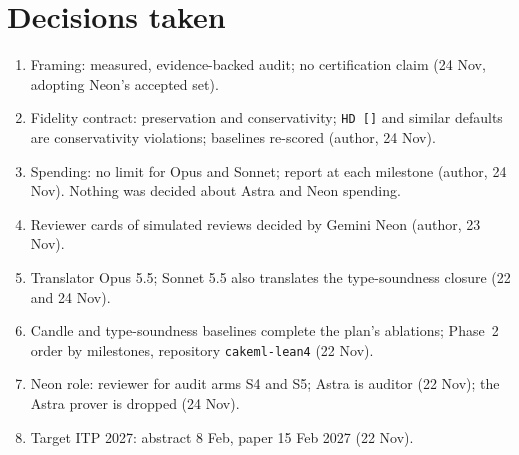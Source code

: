\documentclass[11pt,a4paper]{article}
\newcommand{\code}[1]{\texttt{#1}}
\begin{document}
\section{Decisions taken}
\begin{enumerate}
\item Framing: measured, evidence-backed audit; no certification claim (24 Nov, adopting Neon's accepted set).
\item Fidelity contract: preservation and conservativity; \code{HD []} and similar defaults are conservativity violations; baselines re-scored (author, 24 Nov).
\item Spending: no limit for Opus and Sonnet; report at each milestone (author, 24 Nov). Nothing was decided about Astra and Neon spending.
\item Reviewer cards of simulated reviews decided by Gemini Neon (author, 23 Nov).
\item Translator Opus 5.5; Sonnet 5.5 also translates the type-soundness closure (22 and 24 Nov).
\item Candle and type-soundness baselines complete the plan's ablations; Phase~2 order by milestones, repository \code{cakeml-lean4} (22 Nov).
\item Neon role: reviewer for audit arms S4 and S5; Astra is auditor (22 Nov); the Astra prover is dropped (24 Nov).
\item Target ITP 2027: abstract 8 Feb, paper 15 Feb 2027 (22 Nov).
\end{enumerate}
\end{document}
